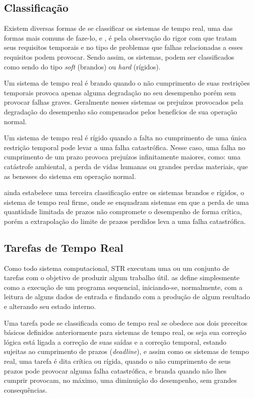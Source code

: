 \subsection{Classificação}
Existem diversas formas de se classificar os sistemas de tempo real, uma das formas mais comuns de faze-lo,  \cite{Farines2000} e \cite{Laplante2012}, é pela observação do rigor com que tratam seus requisitos temporais e no tipo de problemas que falhas relacionadas a esses requisitos podem provocar. Sendo assim, os sistemas, podem ser classificados como sendo do tipo \textit{soft} (brandos) ou \textit{hard} (rígidos). 

Um sistema de tempo real é brando quando o não cumprimento de suas restrições temporais provoca apenas alguma degradação no seu desempenho porém sem provocar falhas graves. Geralmente nesses sistemas os prejuízos provocados pela degradação do desempenho são compensados pelos benefícios de sua operação normal.

Um sistema de tempo real é rígido quando a falta no cumprimento de uma única restrição temporal pode levar a uma falha catastrófica. Nesse caso, uma falha no cumprimento de um prazo provoca prejuízos infinitamente maiores, como: uma catástrofe ambiental, a perda de vidas humanas ou grandes perdas materiais, que as benesses do sistema em operação normal.

\cite{Laplante2012} ainda estabelece uma terceira classificação entre os sistemas brandos e rígidos, o sistema de tempo real firme, onde se enquadram sistemas em que a perda de uma quantidade limitada de prazos não compromete o desempenho de forma crítica, porém a extrapolação do limite de prazos perdidos leva a uma falha catastrófica.

\subsection{Tarefas de Tempo Real}
Como todo sistema computacional, STR executam uma ou um conjunto de tarefas com o objetivo de produzir algum trabalho útil. \cite{Kopetz2002} as define simplesmente como a execução de um programa sequencial, iniciando-se, normalmente, com a leitura de alguns dados de entrada e findando com a produção de algum resultado e alterando seu estado interno. 

Uma tarefa pode se classificada como de tempo real se obedece aos dois preceitos básicos definidos anteriormente para sistemas de tempo real, os seja sua correção lógica está ligada a correção de suas saídas e a correção temporal, estando sujeitas ao cumprimento de prazos (\textit{deadline}), e assim como os sistemas de tempo real, uma tarefa é dita crítica ou rígida, quando o não cumprimento de seus prazos pode provocar alguma falha catastrófica, e branda quando não lhes cumprir provocam, no máximo, uma diminuição do desempenho, sem grandes consequências.

